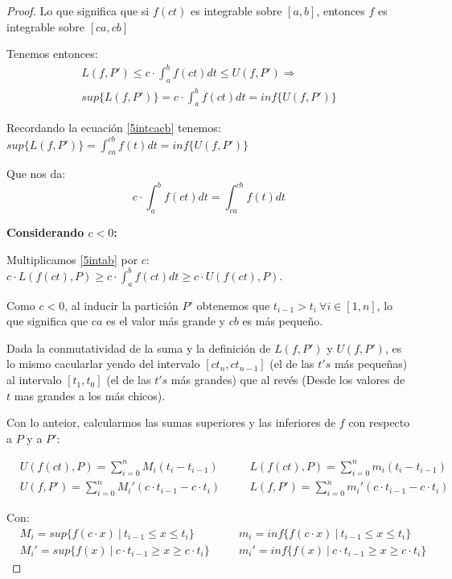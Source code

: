 \documentclass[12pt]{article}
\begin{document}
\begin{proof}
    Lo que significa que si $f(ct)$ es integrable sobre \([a,b]\), entonces $f$ es integrable sobre \([ca,cb]\)

    Tenemos entonces:
    \begin{multline*}
        L(f,P')\leq c\cdot\int_{a}^{b}f(ct)dt\leq U(f,P') \Longrightarrow \\ sup\{L(f,P')\}=c\cdot\int_{a}^{b}f(ct)dt=inf\{U(f,P')\}
    \end{multline*}

    Recordando la ecuaci\'on \eqref{5intcacb} tenemos: \(sup\{L(f,P')\}=\displaystyle\int_{ca}^{cb}f(t)dt=inf\{U(f,P')\}\)

    Que nos da:
    \begin{equation*}
        c\cdot\int_{a}^{b}f(ct)dt=\int_{ca}^{cb}f(t)dt
    \end{equation*}

    \textbf{Considerando $c<0$:}\bigskip

    Multiplicamos \eqref{5intab} por $c$: \quad \(c\cdot L(f(ct),P)\geq c\cdot\int_{a}^{b}f(ct)dt\geq c\cdot U(f(ct),P)\).\bigskip

    Como $c<0$, al inducir la partici\'on $P'$ obtenemos que $t_{i-1}>t_i \ \forall i \in[1,n]$, lo que significa que $ca$ es el valor m\'as grande y $cb$ es m\'as pequeño.\bigskip

    Dada la conmutatividad de la suma y la definici\'on de $L(f,P')$ y $U(f,P')$, es lo mismo cacularlar yendo del intervalo $[ct_n,ct_{n-1}]$ (el de las $t's$ m\'as pequeñas) al intervalo $[t_1,t_0]$ (el de las $t's$ m\'as grandes) que al rev\'es (Desde los valores de $t$ mas grandes a los m\'as chicos).\bigskip

    Con lo anteior, calcularmos las sumas superiores y las inferiores de $f$ con respecto a $P$ y a $P'$:

    \begin{align*}
        &U(f(ct),P)=\sum_{i=0}^n M_i(t_i-t_{i-1}) \quad &&L(f(ct),P)=\sum_{i=0}^n m_i(t_i-t_{i-1})\\
        &U(f,P')=\sum_{i=0}^n M_i'(c\cdot t_{i-1}-c\cdot t_i) \quad &&L(f,P')=\sum_{i=0}^n m_i'(c\cdot t_{i-1}-c\cdot t_i)
    \end{align*}

    Con:
    \begin{align*}
        &M_i=sup\{f(c\cdot x) \ | \ t_{i-1}\leq x\leq t_i\} \quad &&m_i=inf\{f(c\cdot x) \ | \ t_{i-1}\leq x\leq t_i\}\\
        &M_i'=sup\{f(x) \ | \ c\cdot t_{i-1}\geq x\geq c\cdot t_i\} \quad &&m_i'=inf\{f(x) \ | \ c\cdot t_{i-1}\geq x\geq c\cdot t_i\}
    \end{align*}


\end{proof}
\end{document}
